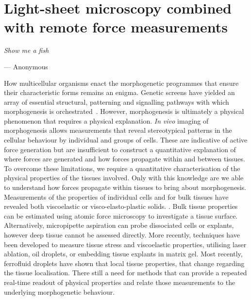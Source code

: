 \ifpdf
    \graphicspath{{Chapter/tweezers/Figs/Raster/}{Chapter/tweezers/Figs/PDF/}{Chapter/tweezers/Figs/}}
\else
    \graphicspath{{Chapter/tweezers/Figs/Vector/}{Chapter/tweezers/Figs/}}
\fi

\chapter[Light-sheet microscopy combined with remote force measurements]{Light-sheet microscopy combined with remote force measurements}\label{chapter:tweezers}
\epigraph{\emph{Show me a fish}}{--- Anonymous}
How multicellular organisms enact the morphogenetic programmes that ensure their characteristic forms remains an enigma.
Genetic screens have yielded an array of essential structural, patterning and signalling pathways with which morphogenesis is orchestrated~\cite{gilbertDevelopmentalBiology2000}.
However, morphogenesis is ultimately a physical phenomenon that requires a physical explanation.
\emph{In vivo} imaging of morphogenesis allows measurements that reveal stereotypical patterns in the cellular behaviour by individual and groups of cells.
These are indicative of active force generation but are insufficient to construct a quantitative explanation of where forces are generated and how forces propagate within and between tissues.
To overcome these limitations, we require a quantitative characterisation of the physical properties of the tissues involved.
Only with this knowledge are we able to understand how forces propagate within tissues to bring about morphogenesis.
Measurements of the properties of individual cells \cite{1}
and for bulk tissues \cite{2}
have revealed both viscoelastic or visco-elasto-plastic solids. \cite{3}.
Bulk tissue properties can be estimated using atomic force microscopy to investigate a tissue surface. \cite{18}
Alternatively, micropipette aspiration can probe dissociated cells or explants, however deep tissue cannot be assessed directly. \cite{?}
More recently, techniques have been developed to measure tissue stress and viscoelastic properties, utilising laser ablation, oil droplets, or embedding tissue explants in matrix gel.
Most recently, ferrofluid droplets have shown that local tissue properties, that change regarding the tissue localisation. \cite{?}
There still a need for methods that can provide a repeated real-time readout of physical properties and relate those measurements to the underlying morphogenetic behaviour.

